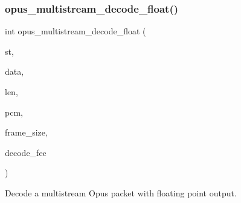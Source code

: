 \subsubsection{\texorpdfstring{opus\+\_\+multistream\+\_\+decode\+\_\+float()}{opus\_multistream\_decode\_float()}}
{\footnotesize\ttfamily int opus\+\_\+multistream\+\_\+decode\+\_\+float (\begin{DoxyParamCaption}\item[{\hyperlink{group__opus__multistream_gad3497495deb9a8ace82e76cd4f93e0e4}{Opus\+M\+S\+Decoder} $\ast$}]{st,  }\item[{const unsigned char $\ast$}]{data,  }\item[{\hyperlink{opus__types_8h_aa4d309d6f80b99dbabebc8f98879ab9a}{opus\+\_\+int32}}]{len,  }\item[{float $\ast$}]{pcm,  }\item[{int}]{frame\+\_\+size,  }\item[{int}]{decode\+\_\+fec }\end{DoxyParamCaption})}



Decode a multistream Opus packet with floating point output. 


